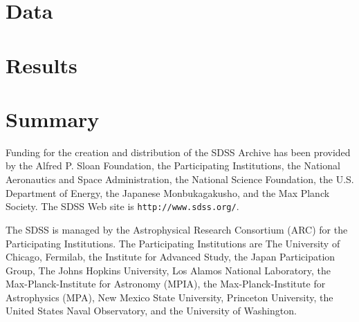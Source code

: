 \documentclass[10pt]{aastex}
\begin{document}
\section{Data}
\label{data}

\section{Results}
\label{results}

\section{Summary}
\label{summary}


\acknowledgments

Funding for the creation and distribution of the SDSS Archive has been
provided by the Alfred P. Sloan Foundation, the Participating
Institutions, the National Aeronautics and Space Administration, the
National Science Foundation, the U.S. Department of Energy, the
Japanese Monbukagakusho, and the Max Planck Society. The SDSS Web site
is {\tt http://www.sdss.org/}.

The SDSS is managed by the Astrophysical Research Consortium (ARC) for
the Participating Institutions. The Participating Institutions are The
University of Chicago, Fermilab, the Institute for Advanced Study, the
Japan Participation Group, The Johns Hopkins University, Los Alamos
National Laboratory, the Max-Planck-Institute for Astronomy (MPIA),
the Max-Planck-Institute for Astrophysics (MPA), New Mexico State
University, Princeton University, the United States Naval Observatory,
and the University of Washington.
 
\begin{thebibliography}{DUM}

\end{thebibliography}

\newpage

%


\end{document}
